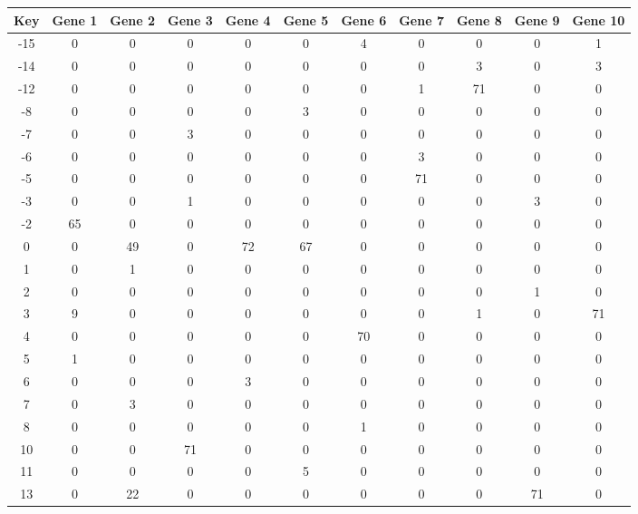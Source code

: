 \begin{tabular}{|c|c|c|c|c|c|c|c|c|c|c|}
\hline
Key & Gene 1 & Gene 2 & Gene 3 & Gene 4 & Gene 5 & Gene 6 & Gene 7 & Gene 8 & Gene 9 & Gene 10 \\
\hline
-15 & 0 & 0 & 0 & 0 & 0 & 4 & 0 & 0 & 0 & 1 \\
-14 & 0 & 0 & 0 & 0 & 0 & 0 & 0 & 3 & 0 & 3 \\
-12 & 0 & 0 & 0 & 0 & 0 & 0 & 1 & 71 & 0 & 0 \\
-8 & 0 & 0 & 0 & 0 & 3 & 0 & 0 & 0 & 0 & 0 \\
-7 & 0 & 0 & 3 & 0 & 0 & 0 & 0 & 0 & 0 & 0 \\
-6 & 0 & 0 & 0 & 0 & 0 & 0 & 3 & 0 & 0 & 0 \\
-5 & 0 & 0 & 0 & 0 & 0 & 0 & 71 & 0 & 0 & 0 \\
-3 & 0 & 0 & 1 & 0 & 0 & 0 & 0 & 0 & 3 & 0 \\
-2 & 65 & 0 & 0 & 0 & 0 & 0 & 0 & 0 & 0 & 0 \\
0 & 0 & 49 & 0 & 72 & 67 & 0 & 0 & 0 & 0 & 0 \\
1 & 0 & 1 & 0 & 0 & 0 & 0 & 0 & 0 & 0 & 0 \\
2 & 0 & 0 & 0 & 0 & 0 & 0 & 0 & 0 & 1 & 0 \\
3 & 9 & 0 & 0 & 0 & 0 & 0 & 0 & 1 & 0 & 71 \\
4 & 0 & 0 & 0 & 0 & 0 & 70 & 0 & 0 & 0 & 0 \\
5 & 1 & 0 & 0 & 0 & 0 & 0 & 0 & 0 & 0 & 0 \\
6 & 0 & 0 & 0 & 3 & 0 & 0 & 0 & 0 & 0 & 0 \\
7 & 0 & 3 & 0 & 0 & 0 & 0 & 0 & 0 & 0 & 0 \\
8 & 0 & 0 & 0 & 0 & 0 & 1 & 0 & 0 & 0 & 0 \\
10 & 0 & 0 & 71 & 0 & 0 & 0 & 0 & 0 & 0 & 0 \\
11 & 0 & 0 & 0 & 0 & 5 & 0 & 0 & 0 & 0 & 0 \\
13 & 0 & 22 & 0 & 0 & 0 & 0 & 0 & 0 & 71 & 0 \\
\hline
\end{tabular}